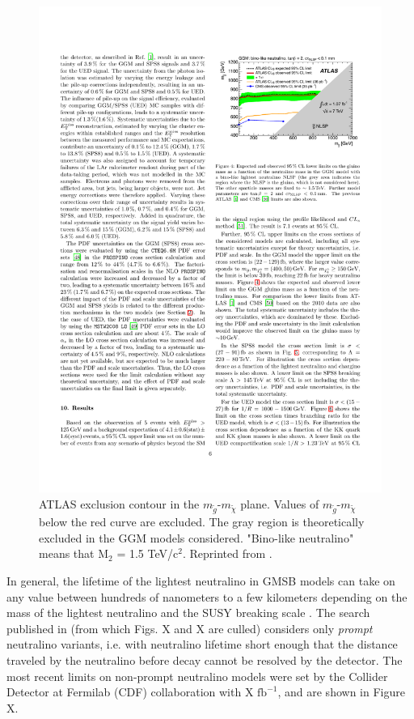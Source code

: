 \documentclass[12pt, letterpaper]{report}
\begin{document}
\begin{figure}
	\centering
	\includegraphics[scale=0.9]{ATLAS_GGM_limit}
	\caption{ATLAS exclusion contour in the $m_{\widetilde{g}}$-$m_{\widetilde{\chi}}$ plane.  Values of $m_{\widetilde{g}}$-$m_{\widetilde{\chi}}$ below the red curve are excluded.  The gray region is theoretically excluded in the GGM models considered.  "Bino-like neutralino" means that $\mbox{M}_{2}$ = 1.5 TeV/$\mbox{c}^{2}$.  Reprinted from \cite{ATLAS_GMSB_1fb-1}.}
\end{figure}

In general, the lifetime of the lightest neutralino in GMSB models can take on any value between hundreds of nanometers to a few kilometers depending on the mass of the lightest neutralino and the SUSY breaking scale \cite{SUSY_primer}.  The search published in \cite{ATLAS_GMSB_1fb-1} (from which Figs. X and X are culled) considers only \textit{prompt} neutralino variants, i.e. with neutralino lifetime short enough that the distance traveled by the neutralino before decay cannot be resolved by the detector.  The most recent limits on non-prompt neutralino models were set by the Collider Detector at Fermilab (CDF) collaboration with X $\mbox{fb}^{-1}$, and are shown in Figure X.
\end{document}
